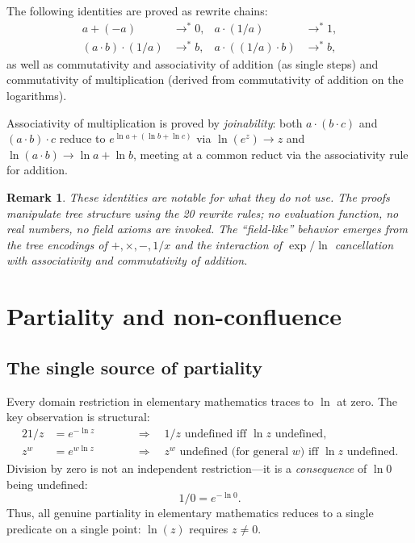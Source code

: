 \documentclass[11pt]{article}
\newtheorem{remark}[theorem]{Remark}
\begin{document}
The following identities are proved as rewrite chains:
\begin{align}
  a + (-a) &\to^{*} 0, &
  a \cdot (1/a) &\to^{*} 1, \label{eq:inv} \\
  (a \cdot b) \cdot (1/a) &\to^{*} b, &
  a \cdot ((1/a) \cdot b) &\to^{*} b, \label{eq:cancel2}
\end{align}
as well as commutativity and associativity of addition (as single
steps) and commutativity of multiplication (derived from commutativity
of addition on the logarithms).

Associativity of multiplication is proved by \emph{joinability}:
both $a \cdot (b \cdot c)$ and $(a \cdot b) \cdot c$ reduce to
$e^{\ln a + (\ln b + \ln c)}$ via $\ln(e^z) \to z$ and
$\ln(a \cdot b) \to \ln a + \ln b$, meeting at a common reduct
via the associativity rule for addition.

\begin{remark}
These identities are notable for what they do \emph{not} use.
The proofs manipulate tree structure using the 20 rewrite rules; no
evaluation function, no real numbers, no field axioms are invoked.
The ``field-like'' behavior emerges from the tree encodings
of $+, \times, -, 1/x$ and the interaction of $\exp/\ln$
cancellation with associativity and commutativity of addition.
\end{remark}

\section{Partiality and non-confluence}
\label{sec:partiality}

\subsection{The single source of partiality}

Every domain restriction in elementary mathematics traces to $\ln$ at
zero.  The key observation is structural:
\begin{alignat}{2}
  1/z &= e^{-\ln z} &\qquad&\Longrightarrow\quad
    \text{$1/z$ undefined iff $\ln z$ undefined},
  \label{eq:inv-ln} \\
  z^w &= e^{w \ln z} &\qquad&\Longrightarrow\quad
    \text{$z^w$ undefined (for general $w$) iff $\ln z$ undefined}.
  \label{eq:pow-ln}
\end{alignat}
Division by zero is not an independent restriction---it is a
\emph{consequence} of $\ln 0$ being undefined:
\[
  1/0 = e^{-\ln 0}.
\]
Thus, all genuine partiality in elementary mathematics reduces to a
single predicate on a single point: $\ln(z)$ requires $z \neq 0$.
\end{document}
